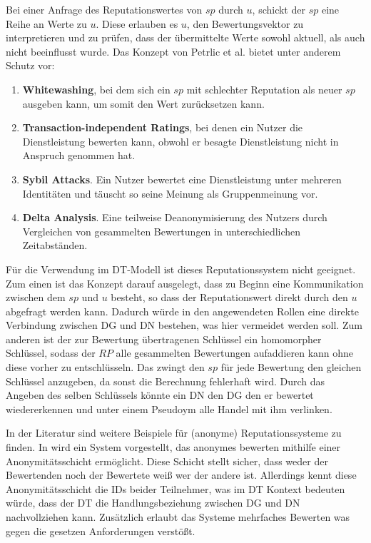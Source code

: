\documentclass[
	fontsize=11pt,
	headings=small,
	parskip=half,           %
	bibliography=totoc,
	numbers=noenddot,       %
	open=any,               %
]{scrreprt}
\begin{document}
Bei einer Anfrage des Reputationswertes von $sp$ durch $u$, schickt der $sp$ eine Reihe an Werte zu $u$. Diese erlauben es $u$, den Bewertungsvektor zu interpretieren und zu prüfen, dass der übermittelte Werte sowohl aktuell, als auch nicht beeinflusst wurde. 
Das Konzept von Petrlic et al. bietet unter anderem Schutz vor: 
\begin{enumerate}
    \item \textbf{Whitewashing}, bei dem sich ein $sp$ mit schlechter Reputation als neuer $sp$ ausgeben kann, um somit den Wert zurücksetzen kann.
    \item \textbf{Transaction-independent Ratings}, bei denen ein Nutzer die Dienstleistung bewerten kann, obwohl er besagte Dienstleistung nicht in Anspruch genommen hat.
    \item \textbf{Sybil Attacks}. Ein Nutzer bewertet eine Dienstleistung unter mehreren Identitäten und täuscht so seine Meinung als Gruppenmeinung vor.
    \item \textbf{Delta Analysis}. Eine teilweise Deanonymisierung des Nutzers durch Vergleichen von gesammelten Bewertungen in unterschiedlichen Zeitabständen.
\end{enumerate} 
Für die Verwendung im DT-Modell ist dieses Reputationssystem nicht geeignet. Zum einen ist das Konzept darauf ausgelegt, dass zu Beginn eine Kommunikation zwischen dem $sp$ und $u$ besteht, so dass der Reputationswert direkt durch den $u$ abgefragt werden kann. Dadurch würde in den angewendeten Rollen eine direkte Verbindung zwischen DG und DN bestehen, was hier vermeidet werden soll. Zum anderen ist der zur Bewertung übertragenen Schlüssel ein homomorpher Schlüssel, sodass der $RP$ alle gesammelten Bewertungen aufaddieren kann ohne diese vorher zu entschlüsseln. Das zwingt den $sp$ für jede Bewertung den gleichen Schlüssel anzugeben, da sonst die Berechnung fehlerhaft wird. Durch das Angeben des selben Schlüssels könnte ein DN den DG den er bewertet wiedererkennen und unter einem Pseudoym alle Handel mit ihm verlinken.

In der Literatur sind weitere Beispiele für (anonyme) Reputationssysteme zu finden. In \cite{rep-muller2008sybil} wird ein System vorgestellt, das anonymes bewerten mithilfe einer Anonymitätsschicht ermöglicht. Diese Schicht stellt sicher, dass weder der Bewertenden noch der Bewertete weiß wer der andere ist. Allerdings kennt diese Anonymitätsschicht die IDs beider Teilnehmer, was im DT Kontext bedeuten würde, dass der DT die Handlungsbeziehung zwischen DG und DN nachvollziehen kann. Zusätzlich erlaubt das Systeme mehrfaches Bewerten was gegen die gesetzen Anforderungen verstößt.
\end{document}
